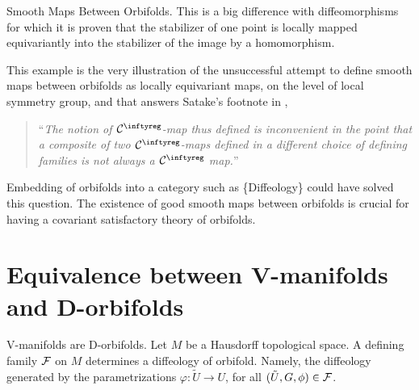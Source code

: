 \begin{Article}{Smooth Maps Between Orbifolds.}{}
  This is a big difference with diffeomorphisms for which it is proven that the stabilizer of one point is locally mapped equivariantly into the stabilizer of the image by a homomorphism.
  \begin{center}
  \end{center}
  This example is the very illustration of the unsuccessful attempt to define smooth maps between orbifolds as locally equivariant maps,
  on the level of local symmetry group,
  and that answers Satake's footnote in \cite[page 469]{Sat57},
  \begin{quote}
    ``{\itshape The notion of $\Cinfty$-map thus defined is inconvenient in the point that a composite of two $\Cinfty$-maps defined in a different choice of defining families is not always a $\Cinfty$ map.}''
  \end{quote}
  Embedding of orbifolds into a category such as \{Diffeology\} could have solved this question.
  The existence of good smooth maps between orbifolds is crucial for having a covariant satisfactory theory of orbifolds.
\end{Article}

\section{Equivalence between V-manifolds and D-orbifolds}

\begin{Article}{V-manifolds are D-orbifolds.}{}
  \label{V-manifolds-are-D-orbifolds}
  Let $M$ be a Hausdorff topological space.
  A defining family $\mathcal{F}$ on $M$ determines a diffeology of orbifold.
  Namely,
  the diffeology generated by the parametrizations $\varphi\colon\tilde U\to U$,
  for all $(\tilde U,G,\phi) \in \mathcal{F}$.
\end{Article}

